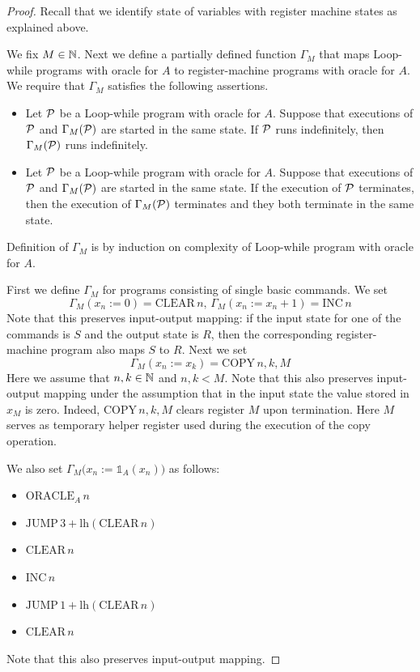 \documentclass[10pt]{amsart}
\begin{document}
\begin{proof}
	Recall that we identify state of variables with register machine states as explained above.

	We fix $M \in {\mathbb N}$. Next we define a partially defined function $\Gamma_M$ that maps Loop-while programs with oracle for $A$ to register-machine programs with oracle for $A$. We require that $\Gamma_M$ satisfies the following assertions.
	\begin{itemize}
		\item[] Let ${\mathcal P}$ be a Loop-while program with oracle for $A$. Suppose that executions of ${\mathcal P}$ and $\Gamma_M({\mathcal P})$ are started in the same state. If ${\mathcal P}$ runs indefinitely, then $\Gamma_M({\mathcal P})$ runs indefinitely.
		\item[] Let ${\mathcal P}$ be a Loop-while program with oracle for $A$. Suppose that executions of ${\mathcal P}$ and $\Gamma_M({\mathcal P})$ are started in the same state. If the execution of ${\mathcal P}$ terminates, then the execution of $\Gamma_M({\mathcal P})$ terminates and they both terminate in the same state.
	\end{itemize}
	Definition of $\Gamma_M$ is by induction on complexity of Loop-while program with oracle for $A$.

	First we define $\Gamma_M$ for programs consisting of single basic commands. We set
	$$\Gamma_M(x_n:=0) = \mathrm{CLEAR}\,n,\,\Gamma_M(x_n:=x_n + 1) = \mathrm{INC}\,n$$
	Note that this preserves input-output mapping: if the input state for one of the commands is $S$ and the output state is $R$, then the corresponding register-machine program also maps $S$ to $R$. Next we set
	$$\Gamma_M(x_n:=x_k) = \mathrm{COPY}\,n,k,M$$
	Here we assume that $n,k\in {\mathbb N}$ and $n,k < M$. Note that this also preserves input-output mapping under the assumption that in the input state the value stored in $x_M$ is zero. Indeed, $\mathrm{COPY}\,n,k,M$ clears register $M$ upon termination. Here $M$ serves as temporary helper register used during the execution of the copy operation.

	We also set $\Gamma_M\big(x_n := \mathbb{1}_A(x_n)\big)$ as follows:
	\begin{itemize}
		\item[] $\mathrm{ORACLE}_A\,n$
		\item[] $\mathrm{JUMP\,}3 + \mathrm{lh}\left(\mathrm{CLEAR\,}n\right)$
		\item[] $\mathrm{CLEAR\,}n$
		\item[] $\mathrm{INC\,}n$
		\item[] $\mathrm{JUMP\,}1 + \mathrm{lh}\left(\mathrm{CLEAR\,}n\right)$
		\item[] $\mathrm{CLEAR\,}n$
	\end{itemize}
	Note that this also preserves input-output mapping.


\end{proof}
\end{document}
